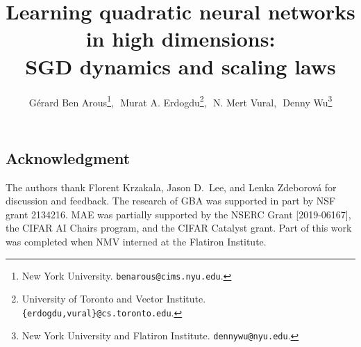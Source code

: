 \documentclass[10pt]{article}
\title{Learning quadratic neural networks in high dimensions:\\ SGD dynamics and scaling laws}
\author{
G\'erard Ben Arous\thanks{New York University. \texttt{benarous@cims.nyu.edu}.},\,\,
Murat A. Erdogdu\thanks{University of Toronto and Vector Institute. \texttt{\{erdogdu,vural\}@cs.toronto.edu}.},\,\,
N. Mert Vural\samethanks[2],\,\,
Denny Wu\thanks{New York University and Flatiron Institute. \texttt{dennywu@nyu.edu}.}
\vspace{-3mm}
}
\begin{document}
\maketitle




\allowdisplaybreaks





\bigskip

\subsection*{Acknowledgment}

The authors thank Florent Krzakala, Jason D.~Lee, and Lenka Zdeborov{\'a} for discussion and feedback. 
The research of GBA was supported in part by NSF grant 2134216. 
MAE was partially supported by the
NSERC Grant [2019-06167], the CIFAR AI Chairs program, and the CIFAR Catalyst grant. 
Part of this work was completed when NMV interned at the Flatiron Institute. 

\bigskip

{


  
 

\newpage

}

\appendix


\end{document}
